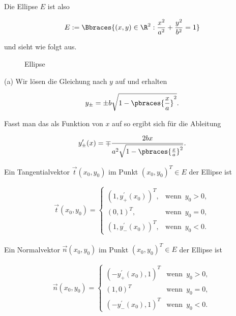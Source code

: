 \begin{solution}

Die Ellipse $E$ ist also

\begin{align*}
  E :=
  \Bbraces
  {
    (x, y) \in \R^2:
    \frac{x^2}{a^2} + \frac{y^2}{b^2} = 1
  }
\end{align*}

und sieht wie folgt aus.

\begin{figure}[h!]
  \centering
  
  \caption{Ellipse}
\end{figure}

(a) Wir lösen die Gleichung nach $y$ auf und erhalten

\begin{align*}
  y_\pm = \pm b \sqrt{1 - \pbraces{\frac{x}{a}}^2}.
\end{align*}

Fasst man das als Funktion von $x$ auf so ergibt sich für die Ableitung

\begin{align*}
  y^\prime_{\pm}(x)
  =
  \mp \frac{2bx}{a^2 \sqrt{1 - \pbraces{\frac{x}{a}}^2}}.
\end{align*}

Ein Tangentialvektor $\vec{t}(x_0, y_0)$ im Punkt $(x_0, y_0)^T \in E$ der Ellipse ist

\begin{align*}
  \vec{t}(x_0, y_0)
  =
  \begin{cases}
    (1, y_+^\prime(x_0))^T,
    & \text{wenn} \enspace y_0 > 0, \\
    (0, 1)^T,
    & \text{wenn} \enspace y_0 = 0, \\
    (1, y_-^\prime(x_0))^T,
    & \text{wenn} \enspace y_0 < 0.
  \end{cases}
\end{align*}

Ein Normalvektor $\vec{n}(x_0, y_0)$ im Punkt $(x_0, y_0)^T \in E$ der Ellipse ist

\begin{align*}
  \vec{n}(x_0, y_0)
  =
  \begin{cases}
    (-y_+^\prime(x_0), 1)^T
    & \text{wenn} \enspace y_0 > 0, \\
    (1, 0)^T
    & \text{wenn} \enspace y_0 = 0, \\
    (-y_-^\prime(x_0), 1)^T
    & \text{wenn} \enspace y_0 < 0.
  \end{cases}
\end{align*}


\end{solution}
